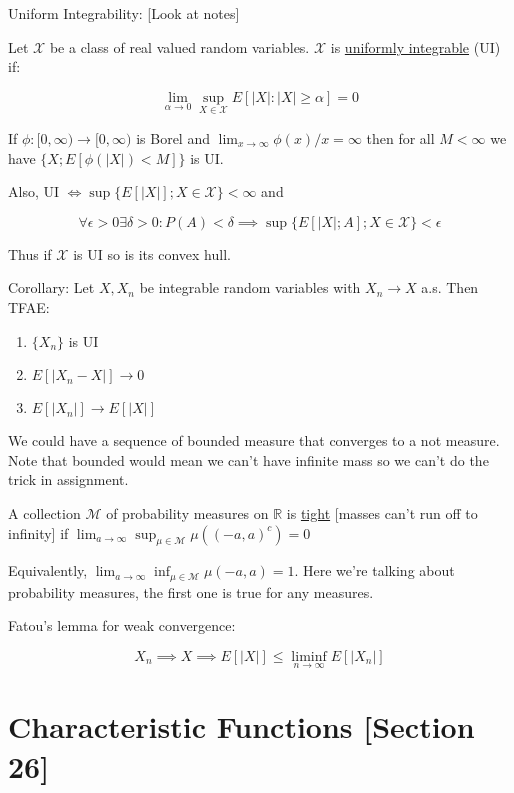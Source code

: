 \documentclass{article}
\theoremstyle{definition}
\begin{document}
Uniform Integrability: [Look at notes]

Let \(\mathcal{X} \) be a class of real valued random variables. \(\mathcal{X} \) is \underline{uniformly integrable} (UI) if:

\[
    \lim_{\alpha  \to 0} \sup_{X\in \mathcal{X}} E[\vert X \vert : \vert X \vert \geq \alpha ] = 0
\]

If \(\phi:[0,\infty)\to [0,\infty)\) is Borel and \(\lim_{x \to \infty} \phi(x) / x = \infty\) then for all \(M < \infty \) we have \(\{ X; E[\phi(|X|)< M] \} \) is UI.

Also, UI \(\iff \sup \{ E[\vert X \vert ]; X\in \mathcal{X} \} < \infty \) and

\[
    \forall \epsilon >0 \exists \delta >0: P(A)<\delta \implies \sup \{ E[\vert X \vert ; A] ; X \in \mathcal{X} \} < \epsilon 
\]

Thus if \(\mathcal{X} \) is UI so is its convex hull.

Corollary: Let \(X,X_n\) be integrable random variables with \(X_n \to X\) a.s. Then TFAE:

\begin{enumerate}
    \item \(\{ X_n \} \) is UI
    \item \(E[\vert X_n - X \vert ] \to 0\)
    \item \(E[\vert X_n \vert ] \to E[\vert X \vert ]\)  
\end{enumerate}

We could have a sequence of bounded measure that converges to a not measure. Note that bounded would mean we can't have infinite mass so we can't do the trick in assignment.

A collection \(\mathcal{M}\) of probability measures on \(\mathbb{R}\) is \underline{tight} [masses can't run off to infinity] if \(\lim_{a \to \infty} \sup _{\mu \in \mathcal{M} }\mu ((-a,a)^c)=0\) 

Equivalently, \(\lim_{a \to \infty} \inf_{\mu \in \mathcal{M}} \mu (-a,a)=1\). Here we're talking about probability measures, the first one is true for any measures.

Fatou's lemma for weak convergence:

\[
    X_n \implies X \implies E[\vert X \vert ] \leq \liminf_{n \to \infty} E[\vert X_n \vert ]
\]

\section*{Characteristic Functions [Section 26]}
\end{document}
